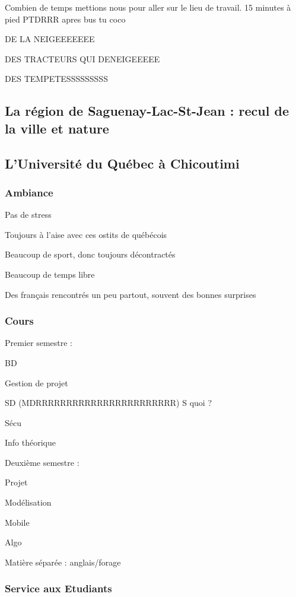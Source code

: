 Combien de temps mettions nous pour aller sur le lieu de travail. 15 minutes à pied PTDRRR apres bus tu coco 

DE LA NEIGEEEEEEE 

DES TRACTEURS QUI DENEIGEEEEE 

DES TEMPETESSSSSSSSS 

\subsection{La région de Saguenay-Lac-St-Jean : recul de la ville et nature}

\subsection{L'Université du Québec à Chicoutimi}
\subsubsection{Ambiance}

Pas de stress 

Toujours à l’aise avec ces ostits de québécois 

Beaucoup de sport, donc toujours décontractés 

Beaucoup de temps libre 

Des français rencontrés un peu partout, souvent des bonnes surprises 

\subsubsection{Cours}

Premier semestre : 

BD 

Gestion de projet 

SD (MDRRRRRRRRRRRRRRRRRRRRRRR) S quoi ?

Sécu 

Info théorique 

Deuxième semestre : 

Projet 

Modélisation  

Mobile 

Algo 

Matière séparée : anglais/forage 

\subsubsection{Service aux Etudiants}

